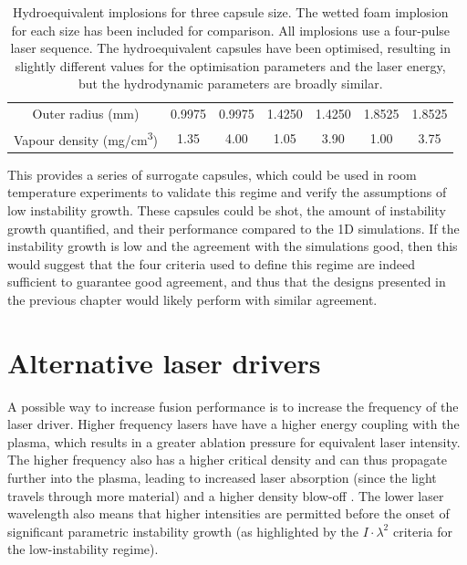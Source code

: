 \begin{table}
{\begin{tabular}{|c|c|c|c|c|c|c|}
Outer radius (\si[per-mode=symbol]{\milli\meter}) & 0.9975 & 0.9975 & 1.4250 & 1.4250 & 1.8525 & 1.8525\\ 
Vapour density (\si[per-mode=symbol]{\milli\gram\per\centi\meter\cubed}) & 1.35 & 4.00 & 1.05 & 3.90 & 1.00 & 3.75\\
\hline
  \end{tabular}}
  \caption{Hydroequivalent implosions for three capsule size. The wetted foam implosion for each size has been included for comparison. All implosions use a four-pulse laser sequence. The hydroequivalent capsules have been optimised, resulting in slightly different values for the optimisation parameters and the laser energy, but the hydrodynamic parameters are broadly similar.}
  \label{tab:Hydroequivalent}
\end{table}

This provides a series of surrogate capsules, which could be used in room temperature experiments to validate this regime and verify the assumptions of low instability growth. These capsules could be shot, the amount of instability growth quantified, and their performance compared to the 1D simulations. If the instability growth is low and the agreement with the simulations good, then this would suggest that the four criteria used to define this regime are indeed sufficient to guarantee good agreement, and thus that the designs presented in the previous chapter would likely perform with similar agreement. 

\section{Alternative laser drivers} \label{sec:AlternativeDrivers}

A possible way to increase fusion performance is to increase the frequency of the laser driver. Higher frequency lasers have have a higher energy coupling with the plasma, which results in a greater ablation pressure for equivalent laser intensity. The higher frequency also has a higher critical density and can thus propagate further into the plasma, leading to increased laser absorption (since the light travels through more material) and a higher density blow-off \cite{Obenschain2020}. The lower laser wavelength also means that higher intensities are permitted before the onset of significant parametric instability growth \cite{Montgomery2016} (as highlighted by the $I \cdot \lambda^2$ criteria for the low-instability regime). 

